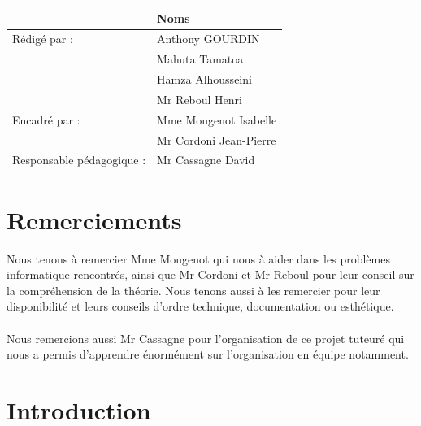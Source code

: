 \documentclass[12pt, a4paper]{report}
\begin{document}
\vspace*{4cm}
\begin{center}
\begin{tabular}{|l|p{7cm}|}
\arrayrulecolor{lightgray}
  \hline
   & Noms\rule[-6pt]{0pt}{20pt} \\
  \hline
  Rédigé par : & Anthony GOURDIN \rule[-6pt]{0pt}{20pt}\\ 
   & Mahuta Tamatoa \rule[-6pt]{0pt}{20pt}\\ 
   & Hamza Alhousseini \rule[-6pt]{0pt}{20pt}\\ 
  \hline
  & Mr Reboul Henri\rule[-6pt]{0pt}{20pt} \\
  Encadré par :  & Mme Mougenot Isabelle \rule[-6pt]{0pt}{20pt}\\
   & Mr Cordoni Jean-Pierre \rule[-6pt]{0pt}{20pt}\\
  \hline
  Responsable pédagogique : & Mr Cassagne David\rule[-6pt]{0pt}{20pt} \\
  \hline
\end{tabular}
\end{center}

\tableofcontents
\thispagestyle{fancy}

\chapter*{ Remerciements}

Nous tenons à remercier Mme Mougenot qui nous à aider dans les problèmes informatique rencontrés, ainsi que Mr Cordoni et Mr Reboul pour leur conseil sur la compréhension de la théorie. Nous tenons aussi à les remercier pour leur disponibilité et leurs conseils d'ordre technique, documentation ou esthétique.
\\
\\
Nous remercions aussi Mr Cassagne pour l'organisation de ce projet tuteuré qui nous a permis d'apprendre énormément sur l'organisation en équipe notamment.

\chapter*{ Introduction}
\end{document}
